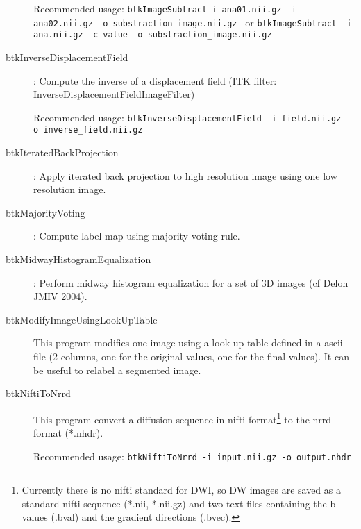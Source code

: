 \begin{description}
Recommended usage: \texttt{btkImageSubtract-i ana01.nii.gz -i ana02.nii.gz -o substraction\_image.nii.gz }
 or \texttt{btkImageSubtract -i ana.nii.gz -c value -o substraction\_image.nii.gz}
\item[btkInverseDisplacementField]: Compute the inverse of a displacement field (ITK filter: InverseDisplacementFieldImageFilter)

Recommended usage: \texttt{btkInverseDisplacementField -i field.nii.gz -o inverse\_field.nii.gz }
\item[btkIteratedBackProjection]: Apply iterated back projection to high resolution image using one low resolution image.
\item[btkMajorityVoting]: Compute label map using majority voting rule.
\item[btkMidwayHistogramEqualization]: Perform midway histogram equalization for a set of 3D images (cf Delon JMIV 2004).
\item[btkModifyImageUsingLookUpTable] This program modifies one image using a
look up table defined in a ascii file (2 columns, one for the original values,
one for the final values). It can be useful to relabel a segmented image. 

\item[btkNiftiToNrrd] This program convert a diffusion sequence in nifti
format\footnote{Currently there is no nifti standard for DWI, so DW images are
saved as a standard nifti sequence (*.nii, *.nii.gz) and two text files
containing the b-values (.bval) and the gradient directions (.bvec).}  to the
nrrd format (*.nhdr). 

Recommended usage: \texttt{btkNiftiToNrrd -i input.nii.gz -o output.nhdr}


\end{description}
